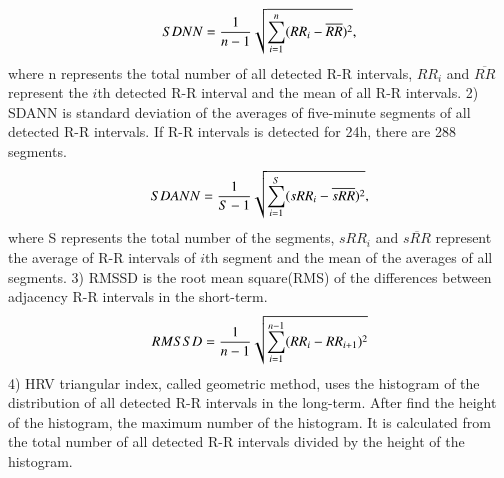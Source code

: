 \documentclass[times,twocolumn,final,authoryear]{elsarticle}
\begin{document}
\begin{equation}
SDNN = {1\over{n-1}}\sqrt{\sum_{i=1}^{n}(RR_i - \overline{RR})^2},
\end{equation} 
 where n represents the total number of all detected R-R intervals, $RR_i$ and $\overline{RR}$ represent the $i$th detected R-R interval and the mean of all R-R intervals.
 2) SDANN is standard deviation of the averages of five-minute segments of all detected R-R intervals. If R-R intervals is detected for 24h, there are 288 segments.
\begin{equation}
SDANN = {1\over{S-1}}\sqrt{\sum_{i=1}^{S}(sRR_i-\overline{sRR})^2 },
\end{equation} where S represents the total number of the segments, $sRR_i$ and $\overline{sRR}$ represent the average of R-R intervals of $i$th segment and the mean of the averages of all segments. 3) RMSSD is the root mean square(RMS) of the differences between adjacency R-R intervals in the short-term. 
\begin{equation}
RMSSD = {1\over{n-1}}\sqrt{\sum_{i=1}^{n-1}(RR_i - RR_{i+1})^2}
\end{equation}
4) HRV triangular index, called geometric method, uses the histogram of the distribution of all detected R-R intervals in the long-term. After find the height of the histogram, the maximum number of the histogram. It is calculated from the total number of all detected R-R intervals divided by the height of the histogram. 
\end{document}
